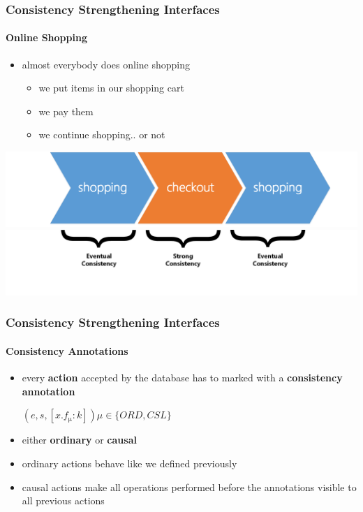 \documentclass[11pt]{beamer}
\begin{document}
\begin{frame}
\frametitle{Consistency Strengthening Interfaces}
\framesubtitle{Online Shopping}
\begin{itemize}
\item almost everybody does online shopping
\begin{itemize}
\item we put items in our shopping cart
\item we pay them
\item we continue shopping.. or not
\end{itemize}
\end{itemize}
\pause
\includegraphics[scale=0.25]{shopping_example.png} \linebreak
\pause
\includegraphics[scale=0.25]{shopping_example_lower.png}
\end{frame}

\begin{frame}
\frametitle{Consistency Strengthening Interfaces}
\framesubtitle{Consistency Annotations}
\begin{itemize}
\item every \textbf{action} accepted by the database has to marked with a \textbf{consistency annotation}
\begin{center} \((e,s,[x.f\mathrm{_{\mu}}:k]) \mu \in \{ORD, CSL\}\)\end{center} 
\item either \textbf{ordinary} or \textbf{causal}
\item ordinary actions behave like we defined previously
\item causal actions make all operations performed before the annotations visible to all previous actions
\end{itemize}
\end{frame}
\end{document}
